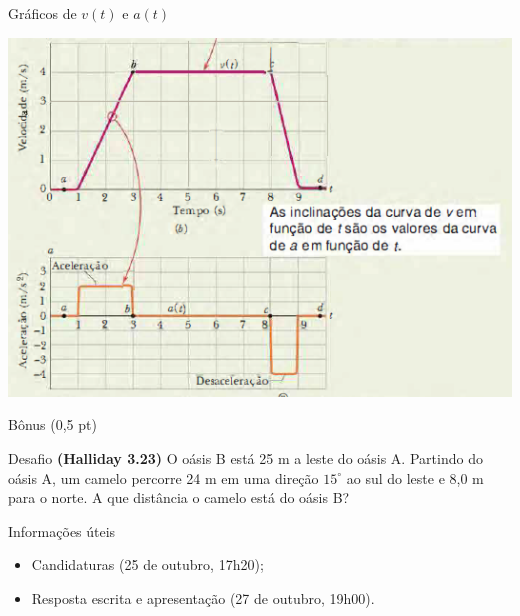 \documentclass[xcolor=dvipsnames,table]{beamer}
\begin{document}
	\begin{frame}{Gráficos de $v(t)$ e $a(t)$}
		\begin{center}
			\includegraphics[scale=0.6]{images/fig2-6bc}
		\end{center}
	\end{frame}
	
	\begin{frame}{Bônus (0,5 pt)}
		\begin{block}{Desafio}
			{\bf (Halliday 3.23)} O oásis B está 25 m a leste do oásis A. Partindo do oásis A, um camelo percorre 24 m em uma direção $15^{\circ}$ ao sul do leste e 8,0 m para o norte. A que distância o camelo está do oásis B?
		\end{block} \pause
		\begin{block}{Informações úteis}
			\begin{itemize}
                \item Candidaturas (25 de outubro, 17h20);
                \item Resposta escrita e apresentação (27 de outubro, 19h00).
			\end{itemize}
		\end{block} 
	\end{frame}
	
	\begin{frame}
		\titlepage
	\end{frame}
	
\end{document}

